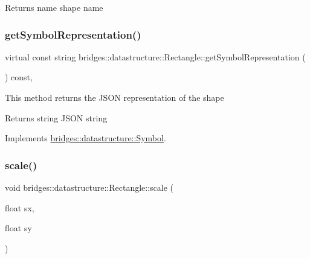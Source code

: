 \begin{DoxyReturn}{Returns}
name shape name 
\end{DoxyReturn}
\mbox{\label{classbridges_1_1datastructure_1_1_rectangle_ada89ed40d2515a3518084f5460ba8dac}} 
\subsubsection{\texorpdfstring{getSymbolRepresentation()}{getSymbolRepresentation()}}
{\footnotesize\ttfamily virtual const string bridges\+::datastructure\+::\+Rectangle\+::get\+Symbol\+Representation (\begin{DoxyParamCaption}{ }\end{DoxyParamCaption}) const\hspace{0.3cm}{\ttfamily [inline]}, {\ttfamily [virtual]}}

This method returns the J\+S\+ON representation of the shape

\begin{DoxyReturn}{Returns}
string J\+S\+ON string 
\end{DoxyReturn}


Implements \mbox{\hyperlink{classbridges_1_1datastructure_1_1_symbol_a8044b3da559dcd9de8510ae339f126c8}{bridges\+::datastructure\+::\+Symbol}}.

\mbox{\label{classbridges_1_1datastructure_1_1_rectangle_ae17021407556e0d434b54a81d94614b3}} 
\subsubsection{\texorpdfstring{scale()}{scale()}}
{\footnotesize\ttfamily void bridges\+::datastructure\+::\+Rectangle\+::scale (\begin{DoxyParamCaption}\item[{float}]{sx,  }\item[{float}]{sy }\end{DoxyParamCaption})\hspace{0.3cm}{\ttfamily [inline]}}

